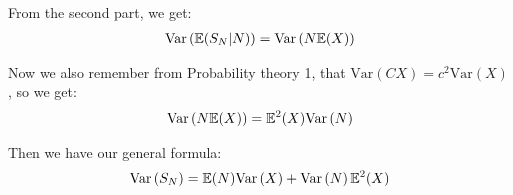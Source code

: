 \noindent From the second part, we get:
\begin{equation*}
  \begin{gathered}
    \text{Var}\left(\mathbb{E}(S_N|N)\right) = \text{Var}\left(N\mathbb{E}(X)\right)
  \end{gathered}
\end{equation*}\par
\noindent Now we also remember from Probability theory 1, that $\text{Var}\left(CX\right) = c^2\text{Var}\left(X\right)$, so we get:
\begin{equation*}
  \begin{gathered}
    \text{Var}\left(N\mathbb{E}(X)\right) = \mathbb{E}^2(X)\text{Var}\left(N\right)
  \end{gathered}
\end{equation*}\par
\noindent Then we have our general formula:
\begin{equation*}
  \begin{gathered}
    \text{Var}\left(S_N\right) = \mathbb{E}(N)\text{Var}\left(X\right) + \text{Var}\left(N\right)\mathbb{E}^2(X)
  \end{gathered}
\end{equation*}
